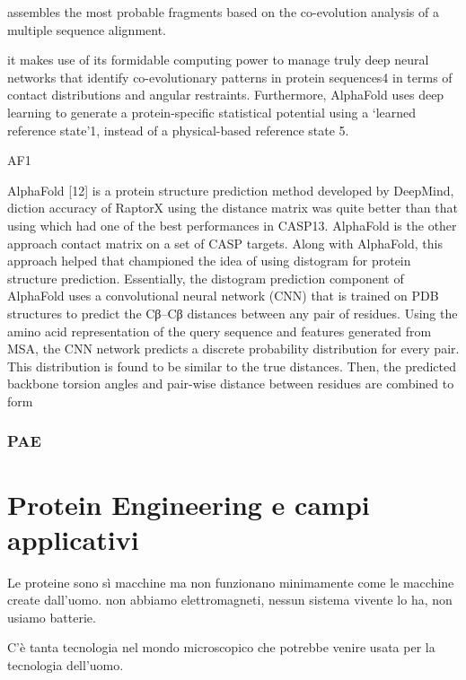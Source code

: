 assembles the most probable
fragments based on the co-evolution
analysis of a multiple sequence alignment.

it makes
use of its formidable computing power
to manage truly deep neural networks
that identify co-evolutionary patterns in
protein sequences4 in terms of contact
distributions and angular restraints.
Furthermore, AlphaFold uses deep
learning to generate a protein-specific
statistical potential using a ‘learned
reference state’1, instead of a physical-based
reference state 5.

AF1

AlphaFold  [12] is a protein structure  prediction  method  developed  by  DeepMind, diction  accuracy  of RaptorX  using  the distance  matrix  was quite better than  that using which  had  one  of  the  best  performances  in  CASP13.  AlphaFold  is  the  other  approach contact matrix on a set of CASP targets. Along with AlphaFold, this approach  helped that championed the idea of using distogram for protein structure prediction. Essentially, the distogram prediction component of AlphaFold uses a convolutional neural network (CNN) that is trained on PDB structures to predict the Cβ–Cβ distances between any pair of residues. Using the amino acid representation of the query sequence and features generated from MSA, the CNN network predicts a discrete probability distribution for every pair. This distribution is found to be similar to the true distances. Then, the predicted backbone torsion angles and pair-wise distance between residues are combined to form \supercite{pakhrin2021deep}

\subsection{PAE}





\chapter{Protein Engineering e campi applicativi}

Le proteine sono sì macchine ma non funzionano minimamente come le macchine create dall'uomo. non abbiamo elettromagneti, nessun sistema vivente lo ha, non usiamo batterie. 

C'è tanta tecnologia nel mondo microscopico che potrebbe venire usata per la tecnologia dell'uomo.

